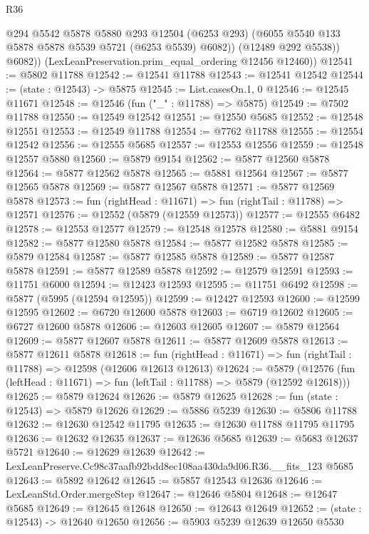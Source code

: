 \begin{lexlean}{R36}
\begin{coremodule}
              @294
              @5542
              @5878
              @5880
              @293
              @12504
              (@6253 @293)
              (@6055 @5540 @133 @5878 @5878 @5539 @5721 (@6253 @5539) @6082))
            (@12489 @292 @5538))
          @6082))
      (LexLeanPreservation.prim_equal_ordering @12456 @12460))
@12541 := @5802 @11788
@12542 := @12541 @11788
@12543 := @12541 @12542
@12544 := (state : @12543) -> @5875
@12545 := List.casesOn.{1, 0}
@12546 := @12545 @11671
@12548 := @12546 (fun ("_" : @11788) => @5875)
@12549 := @7502 @11788
@12550 := @12549 @12542
@12551 := @12550 @5685
@12552 := @12548 @12551
@12553 := @12549 @11788
@12554 := @7762 @11788
@12555 := @12554 @12542
@12556 := @12555 @5685
@12557 := @12553 @12556
@12559 := @12548 @12557 @5880
@12560 := @5879 @9154
@12562 := @5877 @12560 @5878
@12564 := @5877 @12562 @5878
@12565 := @5881 @12564
@12567 := @5877 @12565 @5878
@12569 := @5877 @12567 @5878
@12571 := @5877 @12569 @5878
@12573 := fun (rightHead : @11671) => fun (rightTail : @11788) => @12571
@12576 := @12552 (@5879 (@12559 @12573))
@12577 := @12555 @6482
@12578 := @12553 @12577
@12579 := @12548 @12578
@12580 := @5881 @9154
@12582 := @5877 @12580 @5878
@12584 := @5877 @12582 @5878
@12585 := @5879 @12584
@12587 := @5877 @12585 @5878
@12589 := @5877 @12587 @5878
@12591 := @5877 @12589 @5878
@12592 := @12579 @12591
@12593 := @11751 @6000
@12594 := @12423 @12593
@12595 := @11751 @6492
@12598 := @5877 (@5995 (@12594 @12595))
@12599 := @12427 @12593
@12600 := @12599 @12595
@12602 := @6720 @12600 @5878
@12603 := @6719 @12602
@12605 := @6727 @12600 @5878
@12606 := @12603 @12605
@12607 := @5879 @12564
@12609 := @5877 @12607 @5878
@12611 := @5877 @12609 @5878
@12613 := @5877 @12611 @5878
@12618 := fun (rightHead : @11671) => fun (rightTail : @11788) => @12598 (@12606 @12613 @12613)
@12624 := @5879
    (@12576 (fun (leftHead : @11671) => fun (leftTail : @11788) => @5879 (@12592 @12618)))
@12625 := @5879 @12624
@12626 := @5879 @12625
@12628 := fun (state : @12543) => @5879 @12626
@12629 := @5886 @5239
@12630 := @5806 @11788
@12632 := @12630 @12542 @11795
@12635 := @12630 @11788 @11795 @11795
@12636 := @12632 @12635
@12637 := @12636 @5685
@12639 := @5683 @12637 @5721
@12640 := @12629 @12639
@12642 := LexLeanPreserve.Cc98c37aafb92bdd8ec108aa430da9d06.R36.__fits_123 @5685
@12643 := @5892 @12642
@12645 := @5857 @12543 @12636
@12646 := LexLeanStd.Order.mergeStep
@12647 := @12646 @5804
@12648 := @12647 @5685
@12649 := @12645 @12648
@12650 := @12643 @12649
@12652 := (state : @12543) -> @12640 @12650
@12656 := @5903 @5239 @12639 @12650 @5530

\end{coremodule}
\end{lexlean}
